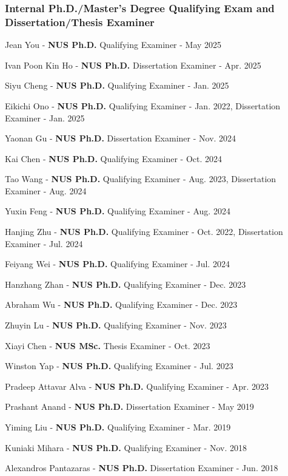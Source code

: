 \documentclass[10pt,a4paper]{article}
\begin{document}
\begin{small}
\subsubsection*{Internal Ph.D./Master's Degree Qualifying Exam and Dissertation/Thesis Examiner}
\begin{etaremune}
\item
Jean You - \textbf{NUS Ph.D.} Qualifying Examiner - May 2025
\item
Ivan Poon Kin Ho - \textbf{NUS Ph.D.} Dissertation Examiner - Apr. 2025
\item
Siyu Cheng - \textbf{NUS Ph.D.} Qualifying Examiner - Jan. 2025
\item
Eikichi Ono - \textbf{NUS Ph.D.} Qualifying Examiner - Jan. 2022, Dissertation Examiner -  Jan. 2025
\item
Yaonan Gu - \textbf{NUS Ph.D.} Dissertation Examiner - Nov. 2024
\item
Kai Chen - \textbf{NUS Ph.D.} Qualifying Examiner - Oct. 2024
\item
Tao Wang - \textbf{NUS Ph.D.} Qualifying Examiner - Aug. 2023, Dissertation Examiner - Aug. 2024
\item
Yuxin Feng - \textbf{NUS Ph.D.} Qualifying Examiner - Aug. 2024
\item
Hanjing Zhu - \textbf{NUS Ph.D.} Qualifying Examiner - Oct. 2022, Dissertation Examiner - Jul. 2024
\item
Feiyang Wei - \textbf{NUS Ph.D.} Qualifying Examiner - Jul. 2024
\item
Hanzhang Zhan - \textbf{NUS Ph.D.} Qualifying Examiner - Dec. 2023
\item
Abraham Wu - \textbf{NUS Ph.D.} Qualifying Examiner - Dec. 2023
\item
Zhuyin Lu - \textbf{NUS Ph.D.} Qualifying Examiner - Nov. 2023
\item
Xiayi Chen - \textbf{NUS MSc.} Thesis Examiner - Oct. 2023
\item
Winston Yap - \textbf{NUS Ph.D.} Qualifying Examiner - Jul. 2023
\item
Pradeep Attavar Alva - \textbf{NUS Ph.D.} Qualifying Examiner - Apr. 2023
\item
Prashant Anand - \textbf{NUS Ph.D.} Dissertation Examiner - May 2019
\item 
Yiming Liu - \textbf{NUS Ph.D.} Qualifying Examiner - Mar. 2019
\item
Kuniaki Mihara - \textbf{NUS Ph.D.} Qualifying Examiner - Nov. 2018
\item
Alexandros Pantazaras - \textbf{NUS Ph.D.} Dissertation Examiner - Jun. 2018
\end{etaremune}


\end{small}
\end{document}
